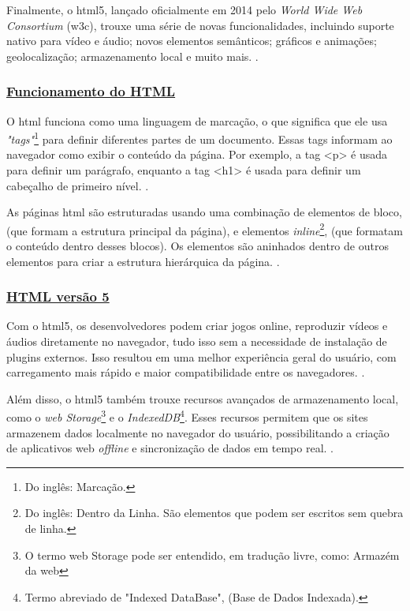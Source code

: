 Finalmente, o
\acrshort{html}5,
lançado oficialmente em 2014 pelo
\textit{World Wide Web Consortium}
(\acrshort{w3c}), trouxe uma série de novas funcionalidades, incluindo suporte nativo para
vídeo e áudio; novos elementos semânticos; gráficos e animações; geolocalização;
armazenamento local e muito mais.
\cite{w3c}.

\subsubsection{\underline{Funcionamento do HTML}}

O
\acrshort{html}
funciona como uma linguagem de marcação, o que significa que ele usa
\textit{"tags"}\footnote{Do inglês: Marcação.
}
para definir diferentes partes de um documento. Essas tags informam ao navegador
como exibir o conteúdo da página. Por exemplo, a tag
<p>
é usada para definir um parágrafo,
enquanto a tag
<h1>
é usada para definir um cabeçalho de primeiro nível.
\cite{w3c}.

As páginas
\acrshort{html}
são estruturadas usando uma combinação de elementos de bloco,
(que formam a estrutura principal da página), e elementos
\textit{inline}\footnote{Do inglês: Dentro da Linha. São elementos que podem ser escritos sem quebra de linha.
},
(que formatam o conteúdo
dentro desses blocos). Os elementos são aninhados dentro de outros elementos para criar a
estrutura hierárquica da página.
\cite{w3c}.

\subsubsection{\underline{HTML versão 5}}

Com o
\acrshort{html}5,
os desenvolvedores podem criar jogos online, reproduzir vídeos e
áudios diretamente no navegador, tudo isso sem a necessidade de instalação de plugins
externos. Isso resultou em uma melhor experiência geral do usuário, com carregamento mais
rápido e maior compatibilidade entre os navegadores.
\cite{w3c}.

Além disso, o
\acrshort{html}5
também trouxe recursos avançados de armazenamento local,
como o
\textit{\acrshort{web} Storage}\footnote{O termo
    \acrshort{web} Storage pode ser entendido, em tradução
    livre, como: Armazém da \acrshort{web}
}
e o
\textit{IndexedDB}\footnote{Termo abreviado de "Indexed DataBase", (Base de Dados Indexada).
}.
Esses recursos permitem que os sites armazenem dados
localmente no navegador do usuário, possibilitando a criação de aplicativos web
\textit{offline}
e
sincronização de dados em tempo real.
\cite{w3c}.

